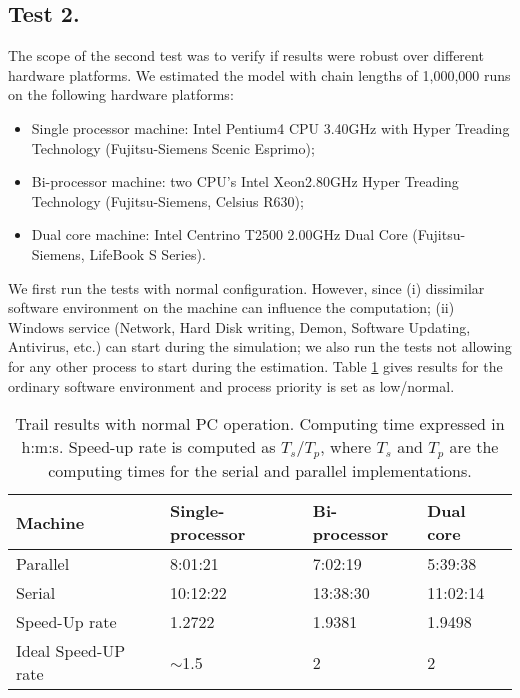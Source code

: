 \documentclass[12pt,a4paper,pdftex]{article}
\begin{document}
\subsection{Test 2.}\label{s:test2}	
The scope of the second test was to verify if results were robust over different hardware platforms.
We estimated the model with chain lengths of 1,000,000 runs on the following hardware platforms:
\begin{itemize}
\item Single processor machine: Intel\textsuperscript{\textregistered} Pentium4\textsuperscript{\textregistered} CPU 3.40GHz with Hyper Treading Technology (Fujitsu-Siemens Scenic Esprimo);
\item Bi-processor machine: two CPU's Intel\textsuperscript{\textregistered} Xeon\texttrademark 2.80GHz Hyper Treading Technology (Fujitsu-Siemens, Celsius R630);
\item Dual core machine: Intel Centrino T2500 2.00GHz Dual Core  (Fujitsu-Siemens, LifeBook S Series).
\end{itemize}

We first run the tests with normal configuration. However, since (i) dissimilar software environment on the machine can influence the computation; (ii) Windows service (Network, Hard Disk writing, Demon, Software Updating, Antivirus, etc.) can start during the simulation; we also run the tests not allowing for any other process to start during the estimation. Table \ref{tab:trail} gives results for the ordinary software environment and process priority is set as low/normal.

\begin{table}
\begin{centering}
\begin{tabular}{l|l|l|l}
Machine	& Single-processor	& Bi-processor	& Dual core \\ \hline
Parallel & 8:01:21 & 7:02:19 & 5:39:38 \\
Serial & 10:12:22 & 13:38:30 & 11:02:14 \\
Speed-Up rate & 1.2722 & 1.9381 & 1.9498\\
Ideal Speed-UP rate &  $\sim$1.5 & 2 & 2 \\
  \hline
\end{tabular}
\caption{Trail results with normal PC operation. Computing time expressed in h:m:s. Speed-up rate is computed as $T_s/T_p$, where $T_s$ and $T_p$ are the computing times for the serial and parallel implementations.}\label{tab:trail}
\end{centering}
\end{table}
\end{document}
